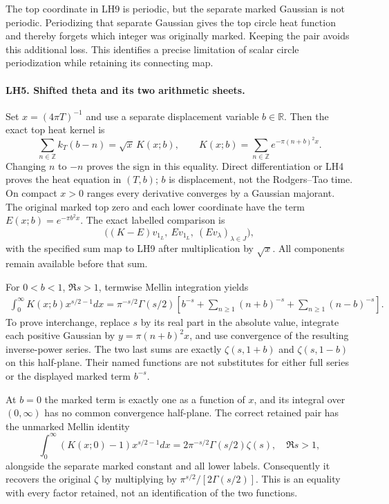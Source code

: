 The top coordinate in LH9 is periodic, but the separate marked
Gaussian is not periodic. Periodizing that separate Gaussian
gives the top circle heat function and thereby forgets which
integer was originally marked. Keeping the pair avoids this
additional loss. This identifies a precise limitation of scalar
circle periodization while retaining its connecting map.

\paragraph{LH5. Shifted theta and its two arithmetic sheets.}
Set \(x=(4\pi T)^{-1}\) and use a separate displacement
variable \(b\in\mathbb R\). Then the exact top heat kernel is
\[
 \sum_{n\in\mathbb Z}k_T(b-n)
   =\sqrt{x}\,K(x;b),\qquad
 K(x;b)=\sum_{n\in\mathbb Z}e^{-\pi(n+b)^2x}.      \tag{LH10}
\]
Changing \(n\) to \(-n\) proves the sign in this equality.
Direct differentiation or LH4 proves the heat equation in
\((T,b)\); \(b\) is displacement, not the Rodgers--Tao time.
On compact \(x>0\) ranges every derivative converges by a
Gaussian majorant. The original marked top zero and each lower
coordinate have the term \(E(x;b)=e^{-\pi b^2x}\). The exact
labelled comparison is
\[
 \big((K-E)v_{1_L},\ E v_{1_L},\ (E v_\lambda)_{\lambda\in J}\big),
                                                               \tag{LH11}
\]
with the specified sum map to LH9 after multiplication by
\(\sqrt x\). All components remain available before that sum.

For \(0<b<1\), \(\Re s>1\), termwise Mellin integration yields
\[
 \begin{split}
 \int_0^\infty K(x;b)x^{s/2-1}dx
  =\pi^{-s/2}\Gamma(s/2)
    \left[b^{-s}+\sum_{n\ge1}(n+b)^{-s}
                    +\sum_{n\ge1}(n-b)^{-s}\right].
 \end{split}\tag{LH12}
\]
To prove interchange, replace \(s\) by its real part in the
absolute value, integrate each positive Gaussian by
\(y=\pi(n+b)^2x\), and use convergence of the resulting
inverse-power series. The two last sums are exactly
\(\zeta(s,1+b)\) and \(\zeta(s,1-b)\) on this half-plane.
Their named functions are not substitutes for either full series
or the displayed marked term \(b^{-s}\).

At \(b=0\) the marked term is exactly one as a function of
\(x\), and its integral over \((0,\infty)\) has no common
convergence half-plane. The correct retained pair has the
unmarked Mellin identity
\[
 \int_0^\infty(K(x;0)-1)x^{s/2-1}dx
      =2\pi^{-s/2}\Gamma(s/2)\zeta(s),\quad\Re s>1,
                                                               \tag{LH13}
\]
alongside the separate marked constant and all lower labels.
Consequently it recovers the original \(\zeta\) by multiplying
by \(\pi^{s/2}/[2\Gamma(s/2)]\). This is an equality with
every factor retained, not an identification of the two functions.

